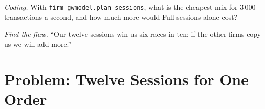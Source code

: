 \begin{exercise}[$\star\star\star$]\label{exo:nw:futures-connectivity:7}
\emph{Coding.} With \texttt{firm\_gwmodel.plan\_sessions}, what is the cheapest mix for 3\,000 transactions a second, and how
much more would Full sessions alone cost?
\end{exercise}

\begin{exercise}[$\star\star\star$]\label{exo:nw:futures-connectivity:8}
\emph{Find the flaw.} ``Our twelve sessions win us six races in ten; if the other firms copy us we will add more.''
\end{exercise}

\section{Problem: Twelve Sessions for One Order}

